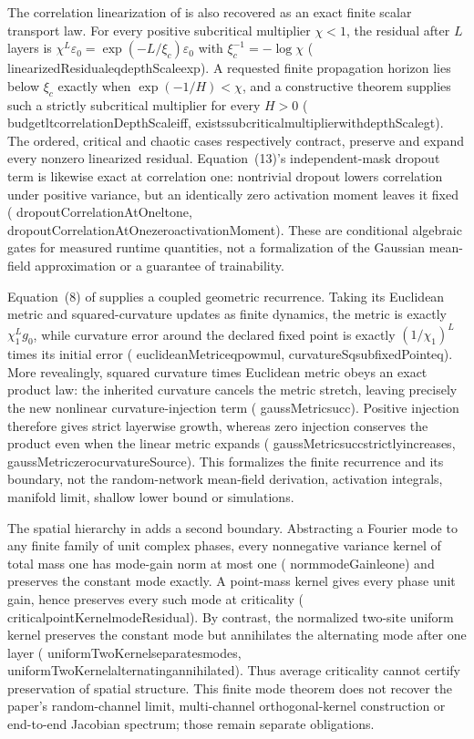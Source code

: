 \documentclass[11pt]{article}
\newcommand{\leanname}[1]{{\scriptsize\ttfamily
  \def\_{\textunderscore\allowbreak}#1}}
\begin{document}
The correlation linearization of \cite{schoenholz2017} is also recovered as an
exact finite scalar transport law. For every positive subcritical multiplier
$\chi<1$, the residual after $L$ layers is
$\chi^L\varepsilon_0=\exp(-L/\xi_c)\varepsilon_0$ with
$\xi_c^{-1}=-\log\chi$
(\leanname{linearizedResidual\_eq\_depthScale\_exp}). A requested finite
propagation horizon lies below $\xi_c$ exactly when
$\exp(-1/H)<\chi$, and a constructive theorem supplies such a strictly
subcritical multiplier for every $H>0$
(\leanname{budget\_lt\_correlationDepthScale\_iff},
\leanname{exists\_subcritical\_multiplier\_with\_depthScale\_gt}).
The ordered, critical and chaotic cases respectively contract, preserve and
expand every nonzero linearized residual. Equation~(13)'s independent-mask
dropout term is likewise exact at correlation one: nontrivial dropout lowers
correlation under positive variance, but an identically zero activation moment
leaves it fixed
(\leanname{dropoutCorrelationAtOne\_lt\_one},
\leanname{dropoutCorrelationAtOne\_zero\_activationMoment}).
These are conditional algebraic gates for measured runtime quantities, not a
formalization of the Gaussian mean-field approximation or a guarantee of
trainability.

Equation~(8) of \cite{poole2016chaos} supplies a coupled geometric recurrence.
Taking its Euclidean metric and squared-curvature updates as finite dynamics,
the metric is exactly $\chi_1^L g_0$, while curvature error around the
declared fixed point is exactly
$(1/\chi_1)^L$ times its initial error
(\leanname{euclideanMetric\_eq\_pow\_mul},
\leanname{curvatureSq\_sub\_fixedPoint\_eq}). More revealingly, squared
curvature times Euclidean metric obeys an exact product law: the inherited
curvature cancels the metric stretch, leaving precisely the new nonlinear
curvature-injection term
(\leanname{gaussMetric\_succ}). Positive injection therefore gives strict
layerwise growth, whereas zero injection conserves the product even when the
linear metric expands
(\leanname{gaussMetric\_succ\_strictly\_increases},
\leanname{gaussMetric\_zero\_curvatureSource}). This formalizes the finite
recurrence and its boundary, not the random-network mean-field derivation,
activation integrals, manifold limit, shallow lower bound or simulations.

The spatial hierarchy in \cite{xiao2018} adds a second boundary. Abstracting a
Fourier mode to any finite family of unit complex phases, every nonnegative
variance kernel of total mass one has mode-gain norm at most one
(\leanname{norm\_modeGain\_le\_one}) and preserves the constant mode exactly.
A point-mass kernel gives every phase unit gain, hence preserves every such
mode at criticality
(\leanname{critical\_pointKernel\_modeResidual}). By contrast, the normalized
two-site uniform kernel preserves the constant mode but annihilates the
alternating mode after one layer
(\leanname{uniformTwoKernel\_separates\_modes},
\leanname{uniformTwoKernel\_alternating\_annihilated}).
Thus average criticality cannot certify preservation of spatial structure.
This finite mode theorem does not recover the paper's random-channel limit,
multi-channel orthogonal-kernel construction or end-to-end Jacobian spectrum;
those remain separate obligations.
\end{document}
